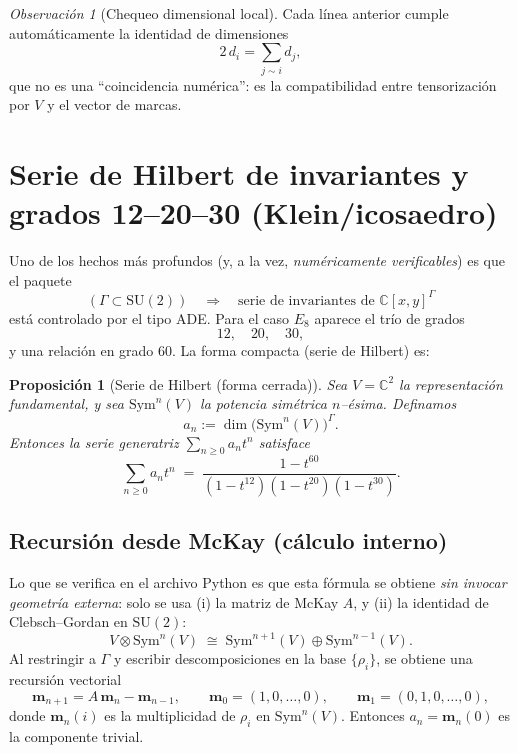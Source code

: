 \documentclass[11pt,a4paper]{article}
\newtheorem{proposition}{Proposición}
\theoremstyle{definition}
\theoremstyle{remark}
\newtheorem{remark}{Observación}
\begin{document}
\begin{remark}[Chequeo dimensional local]
Cada línea anterior cumple automáticamente la identidad de dimensiones
\[
2\,d_i=\sum_{j\sim i} d_j,
\]
que no es una ``coincidencia numérica'': es la compatibilidad entre tensorización por $V$ y el vector de marcas.
\end{remark}

\section{Serie de Hilbert de invariantes y grados 12--20--30 (Klein/icosaedro)}
Uno de los hechos más profundos (y, a la vez, \emph{numéricamente verificables}) es que el paquete
\[
(\Gamma\subset \mathrm{SU}(2)) \quad\Longrightarrow\quad \text{serie de invariantes de } \mathbb C[x,y]^\Gamma
\]
está controlado por el tipo ADE. Para el caso $E_8$ aparece el trío de grados
\[
12,\quad 20,\quad 30,
\]
y una relación en grado $60$. La forma compacta (serie de Hilbert) es:

\begin{proposition}[Serie de Hilbert (forma cerrada)]
Sea $V=\mathbb C^2$ la representación fundamental, y sea $\mathrm{Sym}^n(V)$ la potencia simétrica $n$--ésima.
Definamos
\[
a_n := \dim\bigl(\mathrm{Sym}^n(V)\bigr)^\Gamma.
\]
Entonces la serie generatriz $\sum_{n\ge 0} a_n t^n$ satisface
\[
\sum_{n\ge 0} a_n t^n \;=\;
\frac{1-t^{60}}{(1-t^{12})(1-t^{20})(1-t^{30})}.
\]
\end{proposition}

\subsection{Recursión desde McKay (cálculo interno)}
Lo que se verifica en el archivo Python es que esta fórmula se obtiene \emph{sin invocar geometría externa}:
solo se usa (i) la matriz de McKay $A$, y (ii) la identidad de Clebsch--Gordan en $\mathrm{SU}(2)$:
\[
V\otimes \mathrm{Sym}^n(V)\;\cong\; \mathrm{Sym}^{n+1}(V)\oplus \mathrm{Sym}^{n-1}(V).
\]
Al restringir a $\Gamma$ y escribir descomposiciones en la base $\{\rho_i\}$, se obtiene una recursión vectorial
\[
\bm m_{n+1} = A\,\bm m_n - \bm m_{n-1},
\qquad
\bm m_0 = (1,0,\dots,0),
\qquad
\bm m_1 = (0,1,0,\dots,0),
\]
donde $\bm m_n(i)$ es la multiplicidad de $\rho_i$ en $\mathrm{Sym}^n(V)$.
Entonces $a_n=\bm m_n(0)$ es la componente trivial.
\end{document}
